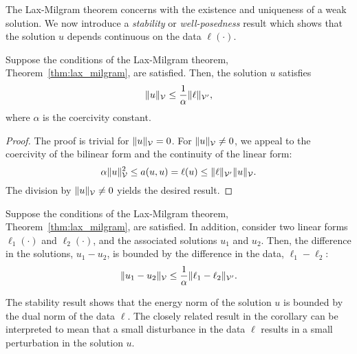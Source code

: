 The Lax-Milgram theorem concerns with the existence and uniqueness of a weak solution.  We now introduce a \emph{stability} or \emph{well-posedness} result which shows that the solution $u$ depends continuous on the data $\ell(\cdot)$.
\begin{proposition}[stability]
  Suppose the conditions of the Lax-Milgram theorem, Theorem~\ref{thm:lax_milgram}, are satisfied. Then, the solution $u$ satisfies
  \begin{equation*}
    \| u \|_{\mathcal{V}} \leq \frac{1}{\alpha} \| \ell \|_{\mathcal{V}'},
  \end{equation*}
  where $\alpha$ is the coercivity constant.
  \begin{proof}
    The proof is trivial for $\| u \|_{\mathcal{V}} = 0$. For $\| u \|_{\mathcal{V}} \neq 0$, we appeal to the coercivity of the bilinear form and the continuity of the linear form:
    \begin{equation*}
      \alpha \| u \|_{\mathcal{V}}^2 \leq a(u,u) = \ell(u) \leq \| \ell \|_{\mathcal{V}'} \| u \|_{\mathcal{V}}.
    \end{equation*}
    The division by $\| u \|_{\mathcal{V}} \neq 0$ yields the desired result.
  \end{proof}
\end{proposition}
\begin{corollary}
  Suppose the conditions of the Lax-Milgram theorem, Theorem~\ref{thm:lax_milgram}, are satisfied.  In addition, consider two linear forms $\ell_1(\cdot)$ and $\ell_2(\cdot)$, and the associated solutions $u_1$ and $u_2$.  Then, the difference in the solutions, $u_1 - u_2$, is bounded by the difference in the data, $\ell_1 - \ell_2$:
  \begin{equation*}
    \| u_1 - u_2 \|_{\mathcal{V}} \leq \frac{1}{\alpha} \| \ell_1 - \ell_2 \|_{\mathcal{V}'}.
  \end{equation*}
\end{corollary}
The stability result shows that the energy norm of the solution $u$ is bounded by the dual norm of the data $\ell$.  The closely related result in the corollary can be interpreted to mean that a small disturbance in the data $\ell$ results in a small perturbation in the solution $u$.


